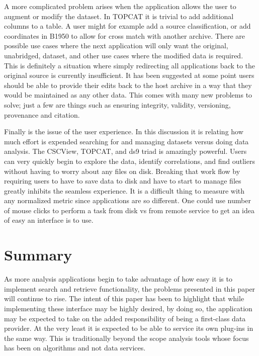A more complicated problem arises when the application allows the user to augment or modify the dataset.  In TOPCAT it is trivial to add additional columns to a table.   A user might for example add a source classification, or add coordinates in B1950 to allow for cross match with another archive. There are possible use cases where the next application will only want the original, unabridged, dataset, and other use cases where the modified data is required.  This is definitely a situation where simply redirecting all applications back to the original source is currently insufficient. It has been suggested at some point users should be able to provide their edits back to the host archive in a way that they would be maintained as any other data.  This comes with many new problems to solve; just a few are things such as ensuring integrity, validity, versioning, provenance and citation.


Finally is the issue of the user experience.  In this discussion it is relating how much effort is expended searching for and managing datasets versus doing data analysis.  The CSCView, TOPCAT, and ds9 triad is amazingly powerful.  Users can very quickly begin to explore the data, identify correlations, and find outliers without having to worry about any files on disk.  Breaking that work flow by requiring users to have to save data to disk and have to start to manage files greatly inhibits the seamless experience.  It is a difficult thing to measure with any normalized metric since applications are so different. One could use number of  mouse clicks to perform a task from disk vs from remote service to get an idea of easy an interface is to use.



\section{Summary}

As more analysis applications begin to take advantage of how easy it is to implement search and retrieve functionality, the problems presented in this paper will continue to rise.  The intent of this paper has been to highlight that while implementing these interface may be highly desired, by doing so, the application may be expected to take on the added responsibility of being a first-class data provider.  At the very least it is expected to be able to service its own plug-ins in the same way.  This is traditionally beyond the scope analysis tools whose focus has been on algorithms and not data services.

